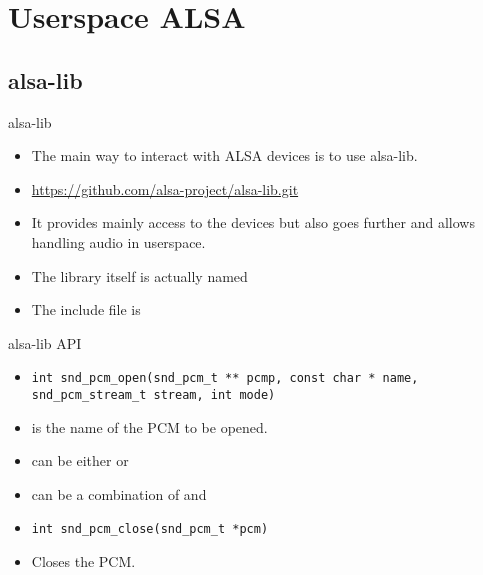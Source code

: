 \section{Userspace ALSA}

\subsection{alsa-lib}

\begin{frame}{alsa-lib}
  \begin{itemize}
  \item The main way to interact with ALSA devices is to use alsa-lib.
  \item \url{https://github.com/alsa-project/alsa-lib.git}
  \item It provides mainly access to the devices but also goes further
    and allows handling audio in userspace.
  \item The library itself is actually named 
  \item The include file is 
  \end{itemize}
\end{frame}

\begin{frame}[fragile]{alsa-lib API}
  \begin{itemize}
  \item 
    \begin{block}{}
    \fontsize{9}{9}\selectfont
      \begin{verbatim}
int snd_pcm_open(snd_pcm_t ** pcmp, const char * name, snd_pcm_stream_t stream, int mode)
      \end{verbatim}
    \end{block}
  \item {} is the name of the PCM to be opened.
  \item {} can be either  or
  \item {} can be a combination of 
    and 
  \item 
    \begin{block}{}
    \fontsize{9}{9}\selectfont
      \begin{verbatim}
int snd_pcm_close(snd_pcm_t *pcm)
      \end{verbatim}
    \end{block}
  \item Closes the PCM.
  \end{itemize}
\end{frame}

